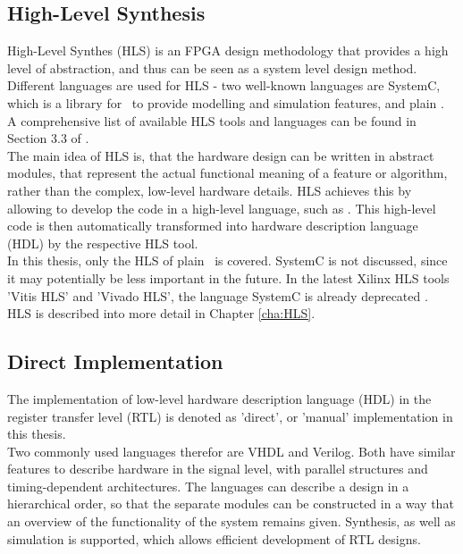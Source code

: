 \subsection{High-Level Synthesis}

High-Level Synthes (HLS) is an FPGA design methodology that provides a high level of abstraction, and thus can be seen as a system level design method.
Different languages are used for HLS - two well-known languages are SystemC, which is a library for \cplusplus\ to provide modelling and simulation features, and plain \cplusplus.
A comprehensive list of available HLS tools and languages can be found in Section 3.3 of \cite{2016FfSP}.\\

The main idea of HLS is, that the hardware design can be written in abstract modules, that represent the actual functional meaning of a feature or algorithm, rather than the complex, low-level hardware details.
HLS achieves this by allowing to develop the code in a high-level language, such as \cplusplus.
This high-level code is then automatically transformed into hardware description language (HDL) by the respective HLS tool.\\

In this thesis, only the HLS of plain \cplusplus\ is covered.
SystemC is not discussed, since it may potentially be less important in the future.
In the latest Xilinx HLS tools 'Vitis HLS' and 'Vivado HLS', the language SystemC is already deprecated \cite{VivadoHlsDeprecatesSystemC}.\\

\noindent
HLS is described into more detail in Chapter \ref{cha:HLS}.


\subsection{Direct Implementation}

The implementation of low-level hardware description language (HDL) in the register transfer level (RTL) is denoted as 'direct', or 'manual' implementation in this thesis.\\

Two commonly used languages therefor are VHDL and Verilog.
Both have similar features to describe hardware in the signal level, with parallel structures and timing-dependent architectures.
The languages can describe a design in a hierarchical order, so that the separate modules can be constructed in a way that an overview of the functionality of the system remains given.
Synthesis, as well as simulation is supported, which allows efficient development of RTL designs.

